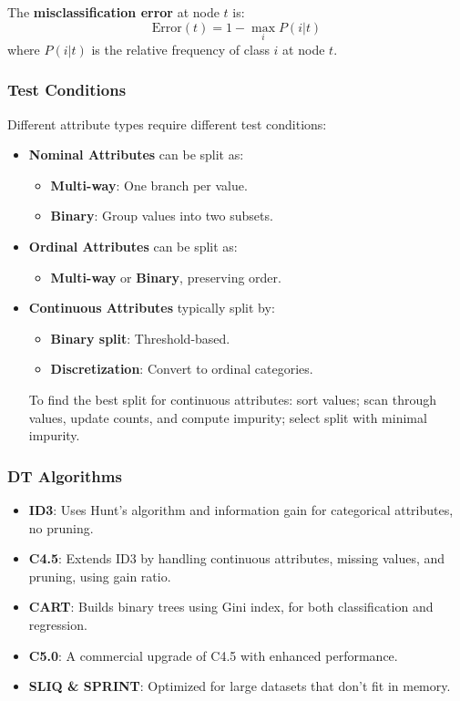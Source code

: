 \begin{definition}
The \textbf{misclassification error} at node $t$ is:
\begin{equation}
\text{Error}(t) = 1 - \max_i P(i|t)
\end{equation}
where $P(i|t)$ is the relative frequency of class $i$ at node $t$.
\end{definition}
\subsubsection{Test Conditions}
Different attribute types require different test conditions:

\begin{itemize}
    \item \textbf{Nominal Attributes} can be split as:
        \begin{itemize}
            \item \textbf{Multi-way}: One branch per value.
            \item \textbf{Binary}: Group values into two subsets.
        \end{itemize}
    \item \textbf{Ordinal Attributes} can be split as:
        \begin{itemize}
            \item \textbf{Multi-way} or \textbf{Binary}, preserving order.
        \end{itemize}
    \item \textbf{Continuous Attributes} typically split by:
        \begin{itemize}
            \item \textbf{Binary split}: Threshold-based.
            \item \textbf{Discretization}: Convert to ordinal categories.
        \end{itemize}
    To find the best split for continuous attributes: sort values; scan through values, update counts, and compute impurity; select split with minimal impurity.
\end{itemize}

\subsubsection{DT Algorithms}
\begin{itemize}
    \item \textbf{ID3}: Uses Hunt's algorithm and information gain for categorical attributes, no pruning.
    \item \textbf{C4.5}: Extends ID3 by handling continuous attributes, missing values, and pruning, using gain ratio.
    \item \textbf{CART}: Builds binary trees using Gini index, for both classification and regression.
    \item \textbf{C5.0}: A commercial upgrade of C4.5 with enhanced performance.
    \item \textbf{SLIQ \& SPRINT}: Optimized for large datasets that don't fit in memory.
\end{itemize}

